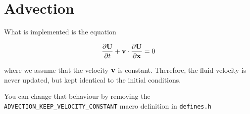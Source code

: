 \section{Advection}


What is implemented is the equation

\begin{equation}
    \frac{\partial \mathbf{U}}{\partial t} + \mathbf{v} \cdot \frac{\partial \mathbf{U}}{\partial \mathbf{x}} = 0
\end{equation}


where we assume that the velocity $\mathbf{v}$ is constant. 
Therefore, the fluid velocity is never updated, but kept identical to the initial conditions.

You can change that behaviour by removing the \verb|ADVECTION_KEEP_VELOCITY_CONSTANT| macro definition in \verb|defines.h|


